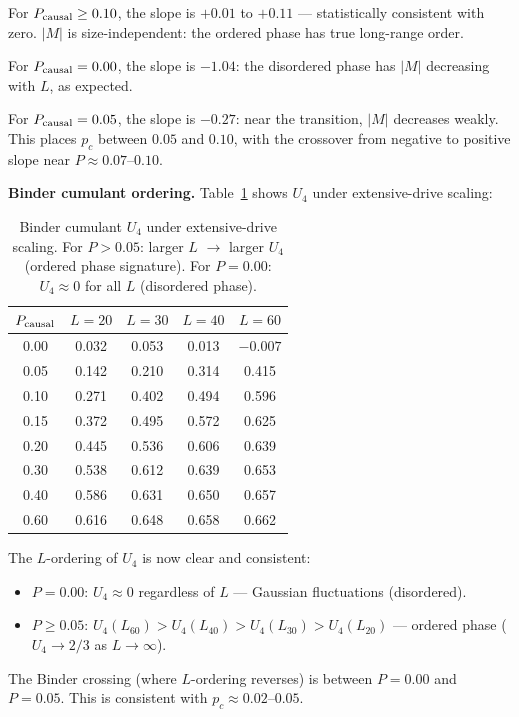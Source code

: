 \documentclass[12pt,a4paper]{article}
\begin{document}
For $P_{\rm causal} \geq 0.10$, the slope is $+0.01$ to $+0.11$ ---
statistically consistent with zero.
$|M|$ is size-independent: the ordered phase has true long-range order.

For $P_{\rm causal} = 0.00$, the slope is $-1.04$: the disordered phase
has $|M|$ decreasing with $L$, as expected.

For $P_{\rm causal} = 0.05$, the slope is $-0.27$: near the transition,
$|M|$ decreases weakly. This places $p_c$ between $0.05$ and $0.10$,
with the crossover from negative to positive slope near $P \approx 0.07$--$0.10$.

\textbf{Binder cumulant ordering.}
Table~\ref{tab:u4_A} shows $U_4$ under extensive-drive scaling:

\begin{table}[h]
\centering
\caption{Binder cumulant $U_4$ under extensive-drive scaling.
For $P > 0.05$: larger $L$ $\to$ larger $U_4$ (ordered phase signature).
For $P = 0.00$: $U_4 \approx 0$ for all $L$ (disordered phase).}
\label{tab:u4_A}
\begin{tabular}{ccccc}
\toprule
$P_{\rm causal}$ & $L=20$ & $L=30$ & $L=40$ & $L=60$ \\
\midrule
0.00 & 0.032 & 0.053 & 0.013 & $-0.007$ \\
0.05 & 0.142 & 0.210 & 0.314 & 0.415 \\
0.10 & 0.271 & 0.402 & 0.494 & 0.596 \\
0.15 & 0.372 & 0.495 & 0.572 & 0.625 \\
0.20 & 0.445 & 0.536 & 0.606 & 0.639 \\
0.30 & 0.538 & 0.612 & 0.639 & 0.653 \\
0.40 & 0.586 & 0.631 & 0.650 & 0.657 \\
0.60 & 0.616 & 0.648 & 0.658 & 0.662 \\
\bottomrule
\end{tabular}
\end{table}

The $L$-ordering of $U_4$ is now clear and consistent:
\begin{itemize}
  \item $P = 0.00$: $U_4 \approx 0$ regardless of $L$ --- Gaussian fluctuations (disordered).
  \item $P \geq 0.05$: $U_4(L_{60}) > U_4(L_{40}) > U_4(L_{30}) > U_4(L_{20})$ ---
    ordered phase ($U_4 \to 2/3$ as $L \to \infty$).
\end{itemize}

The Binder crossing (where $L$-ordering reverses) is between $P = 0.00$ and $P = 0.05$.
This is consistent with $p_c \approx 0.02$--$0.05$.
\end{document}
